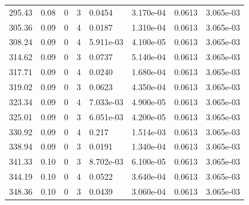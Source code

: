 \documentclass[preview]{standalone}
\begin{document}
{{{\begin{tabular}{L{1.2cm}C{1.2cm} C{0.3cm}C{0.5cm} C{1.4cm}C{1.4cm} C{1.4cm}C{1.4cm}}
  295.43  &  0.08  & 0     &  3 &  0.0454  & 3.170e-04  & 0.0613 &  3.065e-03   \\ 
  305.36  &  0.09  & 0     &  4 &  0.0187  & 1.310e-04  & 0.0613 &  3.065e-03   \\ 
  308.24  &  0.09  & 0     &  4 &  5.911e-03  & 4.100e-05  & 0.0613 &  3.065e-03   \\ 
  314.62  &  0.09  & 0     &  3 &  0.0737  & 5.140e-04  & 0.0613 &  3.065e-03   \\ 
  317.71  &  0.09  & 0     &  4 &  0.0240  & 1.680e-04  & 0.0613 &  3.065e-03   \\ 
  319.02  &  0.09  & 0     &  3 &  0.0623  & 4.350e-04  & 0.0613 &  3.065e-03   \\ 
  323.34  &  0.09  & 0     &  4 &  7.033e-03  & 4.900e-05  & 0.0613 &  3.065e-03   \\ 
  325.01  &  0.09  & 0     &  3 &  6.051e-03  & 4.200e-05  & 0.0613 &  3.065e-03   \\ 
  330.92  &  0.09  & 0     &  4 &  0.217  & 1.514e-03  & 0.0613 &  3.065e-03   \\ 
  338.94  &  0.09  & 0     &  3 &  0.0191  & 1.340e-04  & 0.0613 &  3.065e-03   \\ 
  341.33  &  0.10  & 0     &  3 &  8.702e-03  & 6.100e-05  & 0.0613 &  3.065e-03   \\ 
  344.19  &  0.10  & 0     &  4 &  0.0522  & 3.640e-04  & 0.0613 &  3.065e-03   \\ 
  348.36  &  0.10  & 0     &  3 &  0.0439  & 3.060e-04  & 0.0613 &  3.065e-03   \\ 
\hline 
\end{tabular} 

}}}
\end{document}
